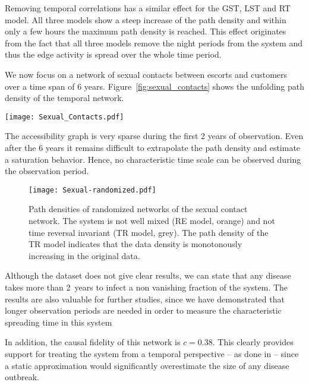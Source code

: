 Removing temporal correlations has a similar effect for the GST, LST and RT model.
All three models show a steep increase of the path density and within only a few hours the maximum path density is reached.
This effect originates from the fact that all three models remove the night periods from the system and thus the edge activity is spread over the whole time period.

We now focus on a network of sexual contacts between escorts and customers over a time span of 6 years.
Figure~\ref{fig:sexual_contacts} shows the unfolding path density of the temporal network.
%
\begin{SCfigure}
\texttt{[image: Sexual\_Contacts.pdf]}
\caption{Path density and shortest path duration distribution for a network of sexual contacts.
Despite the long observation period, the path density does neither saturate nor it reveals a characteristic time scale.}
\label{fig:sexual_contacts}
\end{SCfigure}
%
The accessibility graph is very sparse during the first 2 years of observation.
Even after the 6 years it remains difficult to extrapolate the path density and estimate a saturation behavior.
Hence, no characteristic time scale can be observed during the observation period.
%
\begin{figure}[htb!]
\begin{center}
\texttt{[image: Sexual-randomized.pdf]}
\caption{Path densities of randomized networks of the sexual contact network.
The system is not well mixed (RE model, orange) and not time reversal invariant (TR model, grey).
The path density of the TR model indicates that the data density is monotonously increasing in the original data.}
\label{fig:sexual_randomized}
\end{center}
\end{figure}
%
Although the dataset does not give clear results, we can state that any disease takes more than 2~years to infect a non vanishing fraction of the system.
The results are also valuable for further studies, since we have demonstrated that longer observation periods are needed in order to measure the characteristic spreading time in this system

In addition, the causal fidelity of this network is $c=0.38$.
This clearly provides support for treating the system from a temporal perspective -- as done in \citep{Rocha_pnas} -- since a static approximation would significantly overestimate the size of any disease outbreak.

